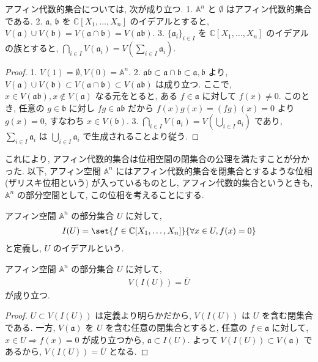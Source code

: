 \documentclass[openany, a4paper, oneside]{jsbook}
\begin{document}
\begin{prop}
アフィン代数的集合については, 次が成り立つ.
1. $\mathbb{A}^n$ と $\emptyset$ はアフィン代数的集合である.
2. $\mathfrak{a}$, $\mathfrak{b}$ を $\mathbb{C}[X_1, \dots, X_n]$ のイデアルとすると,
   $V ( \mathfrak{a} ) \cup V ( \mathfrak{b} ) = V ( \mathfrak{a} \cap \mathfrak{b} ) = V ( \mathfrak{a} \mathfrak{b} )$.
3. $\{ \mathfrak{a}_i \} _{i \in I}$ を $\mathbb{C}[X_1, \dots, X_n]$ のイデアルの族とすると,
   $\bigcap_{i \in I} V ( \mathfrak{a}_i ) = V \left (  \sum_{ i \in I} \mathfrak{a}_i  \right)$.
\end{prop}
\begin{proof}
1. $V (1) = \emptyset, V (0) = \mathbb{A}^n$.
2. $\mathfrak{ab} \subset \mathfrak{a} \cap \mathfrak{b} \subset \mathfrak{a}, \mathfrak{b}$ より,
   $V ( \mathfrak{a} ) \cup V ( \mathfrak{b} ) \subset V ( \mathfrak{a} \cap \mathfrak{b} ) \subset V ( \mathfrak{ab} ) $ は成り立つ.
   ここで,  $x \in V ( \mathfrak{ab} ) , x \notin V ( \mathfrak{a} )$ なる元をとると,
   ある $f \in \mathfrak{a}$ に対して $f (x) \neq 0$.
   このとき, 任意の $g \in \mathfrak{b}$ に対し $fg \in \mathfrak{ab}$ だから $f (x) g (x) = ( fg ) (x) = 0$ より $g (x) = 0$,
   すなわち $x \in V ( \mathfrak{b} )$.
3. $\bigcap_{i \in I} V ( \mathfrak{a}_i ) = V \left ( \bigcup_{i \in I} \mathfrak{a}_i \right)$ であり,
   $\sum_{i \in I} \mathfrak{a}_i$ は $ \bigcup_{i \in I} \mathfrak{a}_i$ で生成されることより従う.
\end{proof}
これにより, アフィン代数的集合は位相空間の閉集合の公理を満たすことが分かった.
以下, アフィン空間 $\mathbb{A}^n$ にはアフィン代数的集合を閉集合とするような位相 (ザリスキ位相という) が入っているものとし,
アフィン代数的集合というときも, $\mathbb{A}^n$ の部分空間として, この位相を考えることにする.

\begin{defn}[イデアル]
アフィン空間 $\mathbb{A}^n$ の部分集合 $U$ に対して,
\begin{align}
 I (U)
 =
 \set{f \in \mathbb{C}[X_1, \dots, X_n]}{\forall x \in U, f(x) = 0}
\end{align}
と定義し,  $U$ のイデアルという. \fin
\end{defn}
\begin{prop}
アフィン空間 $\mathbb{A}^n$ の部分集合 $U$ に対して,
\begin{align}
 V ( I ( U ) )
 =
 \overline{U}
\end{align}
が成り立つ. \fin
\end{prop}
\begin{proof}
$U \subset V ( I ( U ) ) $ は定義より明らかだから,
$V ( I ( U ) )$ は $U$ を含む閉集合である.
一方, $V ( \mathfrak{a} )$ を $U$ を含む任意の閉集合とすると,
任意の $f \in \mathfrak{a}$ に対して, $x \in U \Rightarrow f (x) = 0$ が成り立つから,
$ \mathfrak{a} \subset I ( U )$.
よって $V ( I ( U ) ) \subset V ( \mathfrak{a} ) $ であるから,  $V ( I ( U ) ) = \overline{U} $ となる.
\end{proof}
\end{document}
